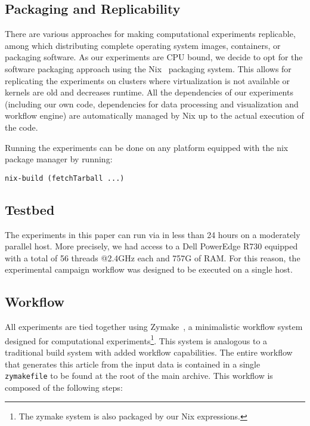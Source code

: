 \documentclass[sigconf]{acmart}
\begin{document}
\subsection{Packaging and Replicability}

There are various approaches for making computational experiments replicable,
among which distributing complete operating system images, containers, or
packaging software. As our experiments are CPU bound, we decide to opt for the
software packaging approach using the Nix~\cite{nix} packaging system. This
allows for replicating the experiments on clusters where virtualization is not
available or kernels are old and decreases runtime. All the dependencies of our
experiments (including our own code, dependencies for data processing and
visualization and workflow engine) are automatically managed by Nix up to the
actual execution of the code.

Running the experiments can be done on any platform equipped with the nix
package manager by running:

\begin{lstlisting}
nix-build (fetchTarball ...)
\end{lstlisting}

\subsection{Testbed}

 The experiments in this paper can run via in less than 24 hours on a moderately parallel
 host. More precisely, we had access to a Dell PowerEdge R730 equipped with
 a total of 56 threads @2.4GHz each and 757G of RAM. For this reason, the
 experimental campaign workflow was designed to be executed on a single host.

 \subsection{Workflow}

 All experiments are tied together using Zymake~\cite{zymake}, a minimalistic
 workflow system designed for computational experiments\footnote{The zymake system
 is also packaged by our Nix expressions.}. This system is
 analogous to a traditional build system with added workflow capabilities. The
 entire workflow that generates this article from the input data is contained
 in a single \lstinline[basicstyle=\ttfamily\color{blue}]|zymakefile| to be
 found at the root of the main archive. This workflow is composed of the
 following steps:
\end{document}
